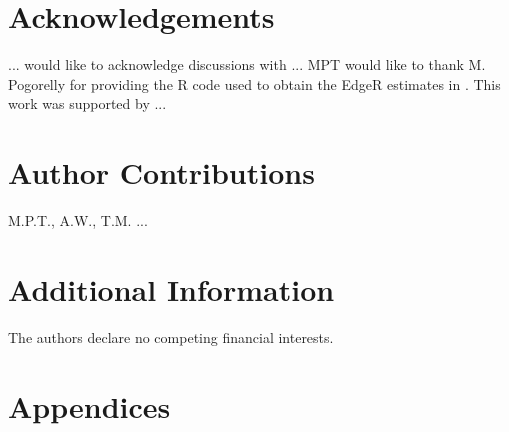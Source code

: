\documentclass[letterpaper,english,prl,reprint,longbibliography]{revtex4-1} %
\begin{document}
\section*{Acknowledgements}
... would like to acknowledge discussions with ... MPT would like to thank M. Pogorelly for providing the R code used to obtain the EdgeR estimates in \citep{Pogorelyy12704}. This work was supported by ... 

\section*{Author Contributions}
M.P.T., A.W., T.M. ... 

\section*{Additional Information}
The authors declare no competing financial interests.
\section*{Appendices}
\appendix
\end{document}
